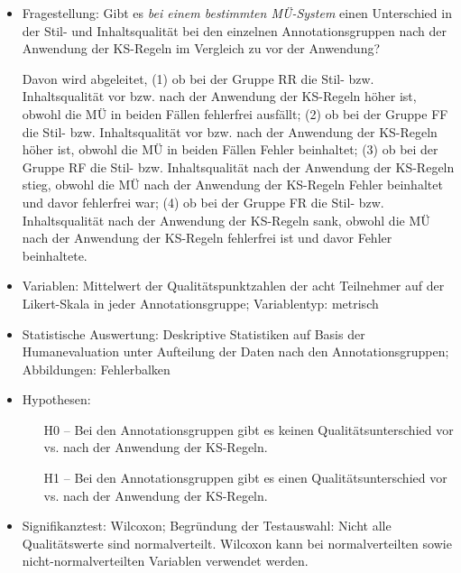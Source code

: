 \begin{itemize}
\item Fragestellung: Gibt es \textit{bei einem bestimmten MÜ-System} einen Unterschied in der Stil- und Inhaltsqualität bei den einzelnen Annotationsgruppen nach der Anwendung der KS-Regeln im Vergleich zu vor der Anwendung?

Davon wird abgeleitet, (1) ob bei der Gruppe RR die Stil- bzw. Inhaltsqualität vor bzw. nach der Anwendung der KS-Regeln höher ist, obwohl die MÜ in beiden Fällen fehlerfrei ausfällt; (2) ob bei der Gruppe FF die Stil- bzw. Inhaltsqualität vor bzw. nach der Anwendung der KS-Regeln höher ist, obwohl die MÜ in beiden Fällen Fehler beinhaltet; (3) ob bei der Gruppe RF die Stil- bzw. Inhaltsqualität nach der Anwendung der KS-Regeln stieg, obwohl die MÜ nach der Anwendung der KS-Regeln Fehler beinhaltet und davor fehlerfrei war; (4) ob bei der Gruppe FR die Stil- bzw. Inhaltsqualität nach der Anwendung der KS-Regeln sank, obwohl die MÜ nach der Anwendung der KS-Regeln fehlerfrei ist und davor Fehler beinhaltete.

\item Variablen: Mittelwert der Qualitätspunktzahlen der acht Teilnehmer auf der Likert-Skala in jeder Annotationsgruppe; Variablentyp: metrisch

\item Statistische Auswertung: Deskriptive Statistiken auf Basis der Humanevaluation unter Aufteilung der Daten nach den Annotationsgruppen; Abbildungen: Fehlerbalken

\item Hypothesen:

\begin{itemize}

\item[H0 --] Bei den Annotationsgruppen gibt es keinen Qualitätsunterschied vor vs. nach der Anwendung der KS-Regeln.

\item[H1 --] Bei den Annotationsgruppen gibt es einen Qualitätsunterschied vor vs. nach der Anwendung der KS-Regeln.

\end{itemize}
\item Signifikanztest: Wilcoxon; Begründung der Testauswahl: Nicht alle Qualitätswerte sind normalverteilt. Wilcoxon kann bei normalverteilten sowie nicht-normalverteilten Variablen verwendet werden.

\end{itemize}

